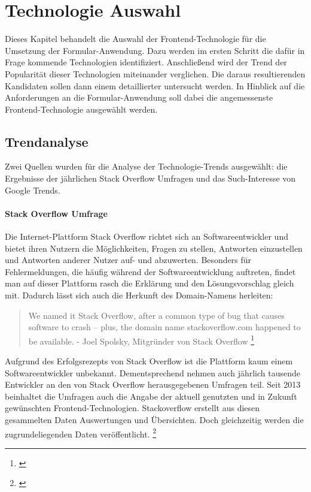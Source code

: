 \section{Technologie Auswahl}

Dieses Kapitel behandelt die Auswahl der Frontend-Technologie für die Umsetzung der Formular-Anwendung. Dazu  werden im ersten Schritt die dafür in Frage kommende Technologien identifiziert.  Anschließend wird der Trend der Popularität dieser Technologien miteinander verglichen. Die daraus resultierenden Kandidaten sollen dann einem detaillierter untersucht werden. In Hinblick auf die Anforderungen an die Formular-Anwendung soll dabei die angemessenste Frontend-Technologie ausgewählt werden.

\subsection{Trendanalyse}

Zwei Quellen wurden für die Analyse der Technologie-Trends ausgewählt: die Ergebnisse der jährlichen Stack Overflow Umfragen und das Such-Interesse von Google Trends. 

\paragraph{Stack Overflow Umfrage}
Die Internet-Plattform Stack Overflow richtet sich an Softwareentwickler und bietet ihren Nutzern die Möglichkeiten, Fragen zu stellen, Antworten einzustellen und Antworten anderer Nutzer auf- und abzuwerten. 
Besonders für Fehlermeldungen, die häufig während der Softwareentwicklung auftreten, findet man auf dieser Plattform rasch die Erklärung und den Lösungsvorschlag gleich mit. Dadurch lässt sich auch die Herkunft des Domain-Namens herleiten:

\begin{quotation}
We named it Stack Overflow, after a common type of bug that causes software to crash -- plus, the domain name stackoverflow.com happened to be available. - Joel Spolsky, Mitgründer von Stack Overflow \footnote{\cite{TheUnprovenPath}}
\end{quotation}

Aufgrund des Erfolgsrezepts von Stack Overflow ist die Plattform kaum einem Softwareentwickler unbekannt. Dementsprechend nehmen auch jährlich tausende Entwickler an den von Stack Overflow herausgegebenen Umfragen teil. Seit  2013 beinhaltet die Umfragen auch die Angabe der aktuell genutzten und in Zukunft gewünschten Frontend-Technologien.
Stackoverflow erstellt aus diesen gesammelten Daten Auswertungen und Übersichten. Doch gleichzeitig werden die zugrundeliegenden Daten veröffentlicht. \footnote{\cite{StackOverflowInsights}} 

